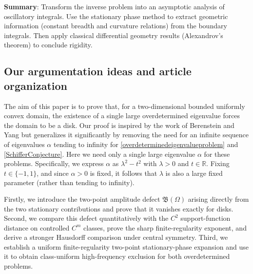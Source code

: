 \documentclass[12pt]{article}
\numberwithin{equation}{section}
\numberwithin{equation}{section}
\begin{document}
\textbf{Summary}: Transform the inverse problem into an asymptotic analysis of oscillatory integrals. Use the stationary phase method to extract geometric information (constant breadth and curvature relations) from the boundary integrals. Then apply classical differential geometry results (Alexandrov's theorem) to conclude rigidity.

\subsection{Our argumentation ideas and article organization}
The aim of this paper is to prove that, for a two-dimensional bounded uniformly convex domain, the existence of a single large overdetermined eigenvalue forces the domain to be a disk. Our proof is inspired by the work of Berenstein and Yang \cite{Berenstein2} but generalizes it significantly by removing the need for an infinite sequence of eigenvalues $\alpha$ tending to infinity for \eqref{overdeterminedeigenvalueproblem} and \eqref{SchifferConjecture}.
Here we need only a single large eigenvalue $\alpha$ for these problems. Specifically, we express $\alpha$ as $\lambda^2 - t^2$ with $\lambda > 0$ and $t\in \mathbb{R}$. Fixing $t\in\{-1,1\}$, and since $\alpha>0$ is fixed, it follows that $\lambda$ is also a large fixed parameter (rather than tending to infinity).

Firstly, we introduce the two-point amplitude
defect $\mathfrak B(\Omega)$ arising directly from the two stationary
contributions and prove that it vanishes exactly for disks. Second, we compare
this defect quantitatively with the $C^2$ support-function distance on
controlled $C^m$ classes, prove the sharp finite-regularity exponent, and
derive a stronger Hausdorff comparison under central symmetry. Third, we
establish a uniform finite-regularity two-point stationary-phase expansion and
use it to obtain class-uniform high-frequency exclusion for both
overdetermined problems.
\end{document}
